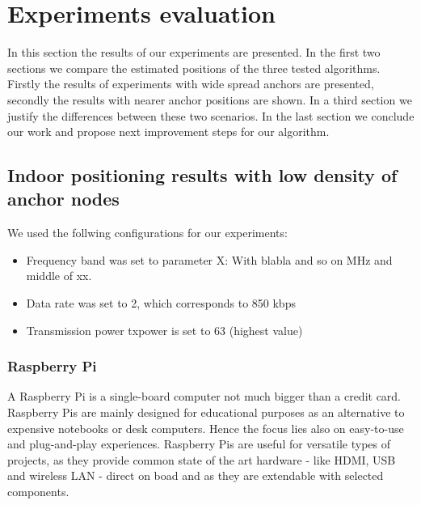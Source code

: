 
\chapter{Experiments evaluation} %

\label{Chapter5} %
In this section the results of our experiments are presented. In the first two sections we compare the estimated positions of the three tested algorithms. Firstly the results of experiments with wide spread anchors are presented, secondly the results with nearer anchor positions are shown. In a third section we justify the differences between these two scenarios. In the last section we conclude our work and propose next improvement steps for our algorithm. 


\section{Indoor positioning results with low density of anchor nodes}
We used the follwing configurations for our experiments:
\begin{itemize}
\item Frequency band was set to parameter X: With blabla and so on MHz and middle of xx. 
\item Data rate was set to 2, which corresponds to 850 kbps
\item Transmission power txpower is set to 63 (highest value)
\end{itemize}


\subsection{Raspberry Pi}
A Raspberry Pi is a single-board computer not much bigger than a credit card. Raspberry Pis are mainly designed for educational purposes as an alternative to expensive notebooks or desk computers. Hence the focus lies also on easy-to-use and plug-and-play experiences. Raspberry Pis are useful for versatile types of projects, as they provide common state of the art hardware - like HDMI, USB and wireless LAN - direct on boad and as they are extendable with selected components.



